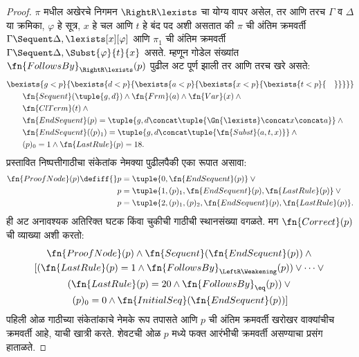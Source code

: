 \begin{proof}
$\pi$ मधील अखेरचे निगमन $\RightR\lexists$ चा योग्य वापर असेल,
तर आणि तरच $\Gamma$ व $\Delta$ या क्रमिका, $\varphi$ हे सूत्र,
$x$ हे चल आणि $t$ हे बंद पद अशी असतात की $\pi$ ची अंतिम क्रमवर्ती
$\Gamma \Sequent \Delta, \lexists[x][\varphi]$ आणि $\pi_1$ ची अंतिम
क्रमवर्ती $\Gamma \Sequent \Delta, \Subst{\varphi}{t}{x}$ असते.
म्हणून गोडेल संख्यांत $\fn{FollowsBy}_{\RightR\lexists}(p)$ पुढील
अट पूर्ण झाली तर आणि तरच खरे असते:
\begin{align*}
  & \bexists{g<p}{\bexists{d<p}{\bexists{a<p}{\bexists{x<p}{\bexists{t<p}{\quad}}}}}\\
  & \qquad \fn{Sequent}(\tuple{g,d}) \land \fn{Frm}(a) \land \fn{Var}(x) \land {}\\
  & \qquad \fn{ClTerm}(t) \land {}\\
  & \qquad \fn{EndSequent}(p) =
  \tuple{
    g,
    d \concat \tuple{\Gn{\lexists} \concat x \concat a}
  } \land {}\\
  & \qquad \fn{EndSequent}((p)_1) =
  \tuple{
    g,
    d \concat \tuple{\fn{Subst}(a, t, x)}
  } \land {}\\
  & \qquad (p)_0 = 1 \land \fn{LastRule}(p) = 18.
\end{align*}
प्रस्तावित निष्पत्तीगाठीचा संकेतांक नेमक्या पुढीलपैकी एका रूपात असावा:
\begin{align*}
\fn{ProofNode}(p) \defiff {}& p=\tuple{0,\fn{EndSequent}(p)} \lor {}\\
& p=\tuple{1,(p)_1,\fn{EndSequent}(p),\fn{LastRule}(p)} \lor {}\\
& p=\tuple{2,(p)_1,(p)_2,\fn{EndSequent}(p),\fn{LastRule}(p)}.
\end{align*}
ही अट अनावश्यक अतिरिक्त घटक किंवा चुकीची गाठीची स्थानसंख्या वगळते.
मग $\fn{Correct}(p)$ ची व्याख्या अशी करतो:
\begin{multline*}
  \fn{ProofNode}(p) \land \fn{Sequent}(\fn{EndSequent}(p)) \land {}\\
  [(\fn{LastRule}(p) = 1 \land
  \fn{FollowsBy}_{\LeftR\Weakening}(p)) \lor \dots \lor {}\\
  (\fn{LastRule}(p) = 20 \land \fn{FollowsBy}_{\eq}(p)) \lor {}\\
  (p)_0 = 0 \land \fn{InitialSeq}(\fn{EndSequent}(p))]
\end{multline*}
पहिली ओळ गाठीच्या संकेतांकाचे नेमके रूप तपासते आणि $p$ ची अंतिम क्रमवर्ती खरोखर वाक्यांचीच
क्रमवर्ती आहे, याची खात्री करते. शेवटची ओळ $p$ मध्ये फक्त आरंभीची
क्रमवर्ती असण्याचा प्रसंग हाताळते.

\end{proof}

